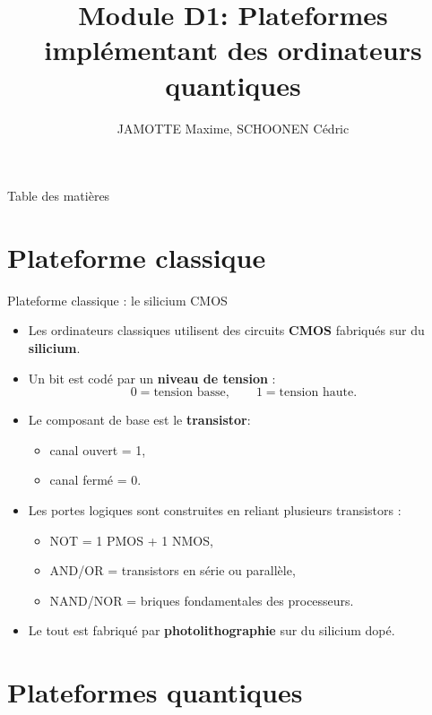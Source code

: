 \documentclass[aspectratio=169,12pt]{beamer}
\title[Module D1]{Module D1: Plateformes implémentant des ordinateurs quantiques}
\author{JAMOTTE Maxime, SCHOONEN Cédric}
\institute{Digital Learning Hub}
\date{}
\begin{document}
\begin{frame}
  \titlepage
\end{frame}

\begin{frame}{Table des matières}
  \tableofcontents
\end{frame}

\section{Plateforme classique}

\begin{frame}{Plateforme classique : le silicium CMOS}
\begin{itemize}
    \item Les ordinateurs classiques utilisent des circuits \textbf{CMOS} fabriqués sur du \textbf{silicium}.
    \item Un bit est codé par un \textbf{niveau de tension} :
    \[
        0 = \text{tension basse}, \qquad 1 = \text{tension haute}.
    \]
    \item Le composant de base est le \textbf{transistor}:
    \begin{itemize}
        \item canal ouvert = 1,
        \item canal fermé = 0.
    \end{itemize}
    \item Les portes logiques sont construites en reliant plusieurs transistors :
    \begin{itemize}
        \item NOT = 1 PMOS + 1 NMOS,
        \item AND/OR = transistors en série ou parallèle,
        \item NAND/NOR = briques fondamentales des processeurs.
    \end{itemize}
    \item Le tout est fabriqué par \textbf{photolithographie} sur du silicium dopé.
\end{itemize}
\end{frame}

\section{Plateformes quantiques}
\end{document}
